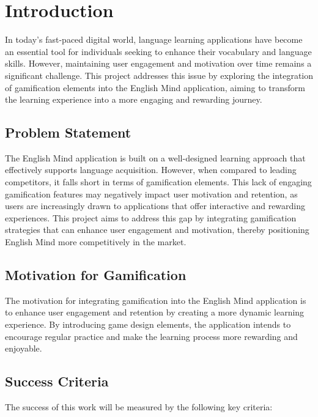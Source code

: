 \chapter{Introduction}

In today's fast-paced digital world, language learning applications have become an essential tool for individuals seeking to enhance their vocabulary and language skills. However, maintaining user engagement and motivation over time remains a significant challenge. This project addresses this issue by exploring the integration of gamification elements into the English Mind application, aiming to transform the learning experience into a more engaging and rewarding journey.

\section*{Problem Statement}

The English Mind application is built on a well-designed learning approach that effectively supports language acquisition. However, when compared to leading competitors, it falls short in terms of gamification elements. This lack of engaging gamification features may negatively impact user motivation and retention, as users are increasingly drawn to applications that offer interactive and rewarding experiences. This project aims to address this gap by integrating gamification strategies that can enhance user engagement and motivation, thereby positioning English Mind more competitively in the market.

\section*{Motivation for Gamification}

The motivation for integrating gamification into the English Mind application is to enhance user engagement and retention by creating a more dynamic learning experience. By introducing game design elements, the application intends to encourage regular practice and make the learning process more rewarding and enjoyable.

\section*{Success Criteria}

The success of this work will be measured by the following key criteria:


